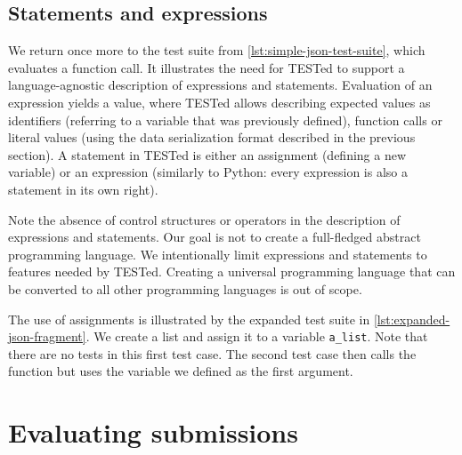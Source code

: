 \documentclass[../main]{subfiles}
\begin{document}

\subsection{Statements and expressions}\label{subsec:tested1-statements-and-expressions}

We return once more to the test suite from \cref{lst:simple-json-test-suite}, which evaluates a function call.
It illustrates the need for TESTed to support a language-agnostic description of expressions and statements.
Evaluation of an expression yields a value, where TESTed allows describing expected values as identifiers (referring to a variable that was previously defined), function calls or literal values (using the data serialization format described in the previous section).
A statement in TESTed is either an assignment (defining a new variable) or an expression (similarly to Python: every expression is also a statement in its own right).

Note the absence of control structures or operators in the description of expressions and statements.
Our goal is not to create a full-fledged abstract programming language.
We intentionally limit expressions and statements to features needed by TESTed.
Creating a universal programming language that can be converted to all other programming languages is out of scope.

The use of assignments is illustrated by the expanded test suite in \cref{lst:expanded-json-fragment}.
We create a list and assign it to a variable \texttt{a\_list}.
Note that there are no tests in this first test case.
The second test case then calls the function but uses the variable we defined as the first argument.

\section{Evaluating submissions}\label{sec:tested1-evaluating-submissions}
\end{document}
